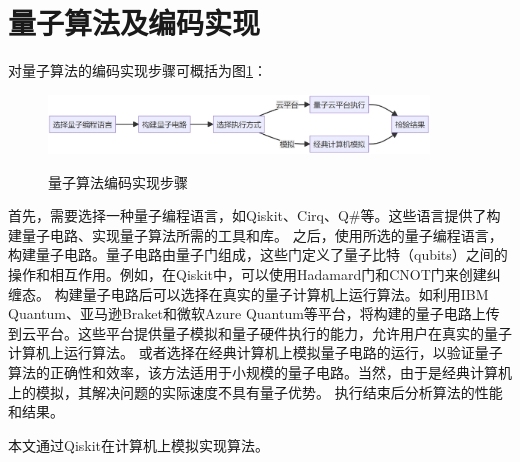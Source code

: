 \section{量子算法及编码实现}

对量子算法的编码实现步骤可概括为图\ref{fig_al}：
\begin{figure}[htb]
    \centering
    \caption{量子算法编码实现步骤}
    \includegraphics[width=0.9\textwidth]{figures/export.png}
    \label{fig_al}
\end{figure}

首先，需要选择一种量子编程语言，如Qiskit、Cirq、Q\#等。这些语言提供了构建量子电路、实现量子算法所需的工具和库。
之后，使用所选的量子编程语言，构建量子电路。量子电路由量子门组成，这些门定义了量子比特（qubits）之间的操作和相互作用。例如，在Qiskit中，可以使用Hadamard门和CNOT门来创建纠缠态。
构建量子电路后可以选择在真实的量子计算机上运行算法。如利用IBM Quantum、亚马逊Braket和微软Azure Quantum等平台，将构建的量子电路上传到云平台。这些平台提供量子模拟和量子硬件执行的能力，允许用户在真实的量子计算机上运行算法。
或者选择在经典计算机上模拟量子电路的运行，以验证量子算法的正确性和效率，该方法适用于小规模的量子电路。当然，由于是经典计算机上的模拟，其解决问题的实际速度不具有量子优势。
执行结束后分析算法的性能和结果。

本文通过Qiskit在计算机上模拟实现算法。

